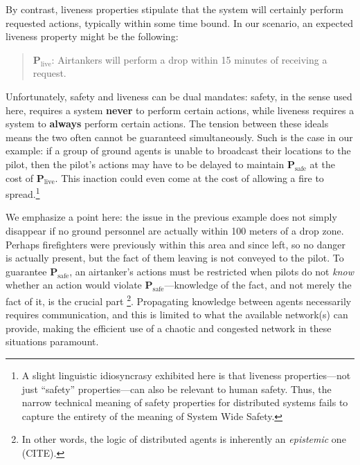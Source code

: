 \documentclass[]             %
{NASA}                       %
\theoremstyle{definition}
\begin{document}
\noindent By contrast, liveness properties stipulate that the system
will certainly perform requested actions, typically within some time
bound. In our scenario, an expected liveness property might be the
following:

\begin{quote}
    $\textbf{P}_\textrm{live}$:
    Airtankers will perform a drop within 15 minutes of receiving a request.
\end{quote}

Unfortunately, safety and liveness can be dual mandates: safety, in the
sense used here, requires a system \textbf{never} to perform certain
actions, while liveness requires a system to \textbf{always} perform
certain actions. The tension between these ideals means the two often
cannot be guaranteed simultaneously. Such is the case in our example: if
a group of ground agents is unable to broadcast their locations to the
pilot, then the pilot's actions may have to be delayed to maintain
\(\textbf{P}_\textrm{safe}\) at the cost of
\(\textbf{P}_\textrm{live}\). This inaction could even come at the cost
of allowing a fire to spread.\footnote{A slight linguistic idiosyncrasy
  exhibited here is that liveness properties---not just ``safety''
  properties---can also be relevant to human safety. Thus, the narrow
  technical meaning of safety properties for distributed systems fails
  to capture the entirety of the meaning of System Wide Safety.}

We emphasize a point here: the issue in the previous example does not
simply disappear if no ground personnel are actually within 100 meters
of a drop zone. Perhaps firefighters were previously within this area
and since left, so no danger is actually present, but the fact of them
leaving is not conveyed to the pilot. To guarantee
\(\textbf{P}_\textrm{safe}\), an airtanker's actions must be restricted
when pilots do not \emph{know} whether an action would violate
\(\textbf{P}_\textrm{safe}\)---knowledge of the fact, and not merely the
fact of it, is the crucial part \footnote{In other words, the logic of
  distributed agents is inherently an \emph{epistemic} one (CITE).}.
Propagating knowledge between agents necessarily requires communication,
and this is limited to what the available network(s) can provide, making
the efficient use of a chaotic and congested network in these situations
paramount.
\end{document}
